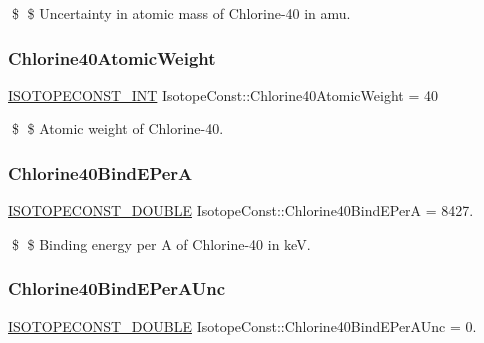 \$ \$ Uncertainty in atomic mass of Chlorine-\/40 in amu. \mbox{\label{group___isotope_const-_chlorine-_cl40_ga1d93d181ed5e0834f3a8ee0b7afcebdd}} 
\subsubsection{\texorpdfstring{Chlorine40\+Atomic\+Weight}{Chlorine40AtomicWeight}}
{\footnotesize\ttfamily \mbox{\hyperlink{group___isotope_const-_macros_ga5f18360b3e99483a35c32d789e62621c}{I\+S\+O\+T\+O\+P\+E\+C\+O\+N\+S\+T\+\_\+\+I\+NT}} Isotope\+Const\+::\+Chlorine40\+Atomic\+Weight = 40}

\$ \$ Atomic weight of Chlorine-\/40. \mbox{\label{group___isotope_const-_chlorine-_cl40_gac0c5ae5f919a6ccd91c7ef00fd8b84a2}} 
\subsubsection{\texorpdfstring{Chlorine40\+Bind\+E\+PerA}{Chlorine40BindEPerA}}
{\footnotesize\ttfamily \mbox{\hyperlink{group___isotope_const-_macros_ga8f45a7272ce02c0b4c65c44636ed719a}{I\+S\+O\+T\+O\+P\+E\+C\+O\+N\+S\+T\+\_\+\+D\+O\+U\+B\+LE}} Isotope\+Const\+::\+Chlorine40\+Bind\+E\+PerA = 8427.}

\$ \$ Binding energy per A of Chlorine-\/40 in keV. \mbox{\label{group___isotope_const-_chlorine-_cl40_ga791a41fbc1846ac5671d233d937f4ae1}} 
\subsubsection{\texorpdfstring{Chlorine40\+Bind\+E\+Per\+A\+Unc}{Chlorine40BindEPerAUnc}}
{\footnotesize\ttfamily \mbox{\hyperlink{group___isotope_const-_macros_ga8f45a7272ce02c0b4c65c44636ed719a}{I\+S\+O\+T\+O\+P\+E\+C\+O\+N\+S\+T\+\_\+\+D\+O\+U\+B\+LE}} Isotope\+Const\+::\+Chlorine40\+Bind\+E\+Per\+A\+Unc = 0.}

